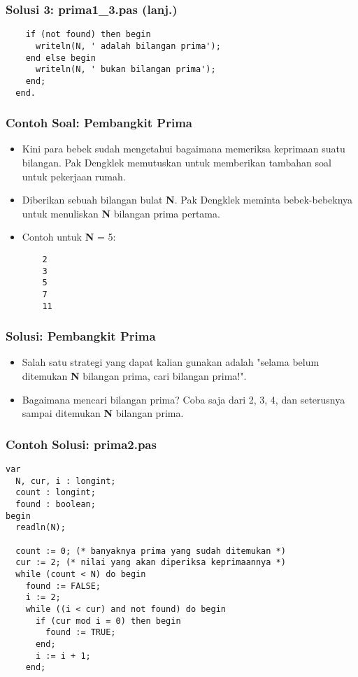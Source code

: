 \begin{frame}[fragile]
\frametitle{Solusi 3: prima1\_3.pas (lanj.)}
\begin{lstlisting}
    if (not found) then begin
      writeln(N, ' adalah bilangan prima');
    end else begin
      writeln(N, ' bukan bilangan prima');
    end;
  end.
\end{lstlisting}
\end{frame}

\begin{frame}[fragile]
\frametitle{Contoh Soal: Pembangkit Prima}
\begin{itemize}
  \item Kini para bebek sudah mengetahui bagaimana memeriksa keprimaan suatu bilangan. Pak Dengklek memutuskan untuk memberikan tambahan soal untuk pekerjaan rumah.
  \item Diberikan sebuah bilangan bulat \textbf{N}. Pak Dengklek meminta bebek-bebeknya untuk menuliskan \textbf{N} bilangan prima pertama.
  \item Contoh untuk \textbf{N} = 5:
  \begin{lstlisting}
    2
    3
    5
    7
    11
  \end{lstlisting}
\end{itemize}
\end{frame}

\begin{frame}
\frametitle{Solusi: Pembangkit Prima}
\begin{itemize}
  \item Salah satu strategi yang dapat kalian gunakan adalah "selama belum ditemukan \textbf{N} bilangan prima, cari bilangan prima!".
  \item Bagaimana mencari bilangan prima? Coba saja dari 2, 3, 4, dan seterusnya sampai ditemukan \textbf{N} bilangan prima.
\end{itemize}
\end{frame}

\begin{frame}[fragile]
\frametitle{Contoh Solusi: prima2.pas}
\begin{lstlisting}
var
  N, cur, i : longint;
  count : longint;
  found : boolean;
begin
  readln(N);

  count := 0; (* banyaknya prima yang sudah ditemukan *)
  cur := 2; (* nilai yang akan diperiksa keprimaannya *)
  while (count < N) do begin
    found := FALSE;
    i := 2;
    while ((i < cur) and not found) do begin
      if (cur mod i = 0) then begin
        found := TRUE;
      end;
      i := i + 1;
    end;
\end{lstlisting}
\end{frame}

